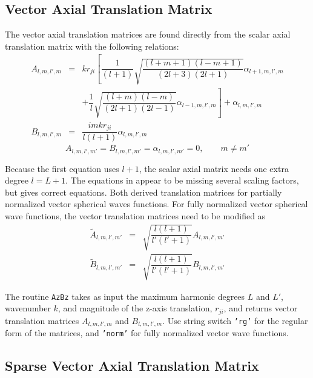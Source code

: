 \subsection{Vector Axial Translation Matrix}

The vector axial translation matrices are found directly from the scalar axial translation matrix with the following relations:
\begin{eqnarray}
A_{l,m,l',m} &=& k r_{ji}\left[\dfrac{1}{(l+1)}\sqrt{\dfrac{(l+m+1)(l-m+1)}{(2l+3)(2l+1)}} \alpha_{l+1,m,l',m} \right. \nonumber \\
\ & \ & + \left. \dfrac{1}{l}\sqrt{\dfrac{(l+m)(l-m)}{(2l+1)(2l-1)}}\alpha_{l-1,m,l',m} \right] + \alpha_{l,m,l',m} \\
B_{l,m,l',m} &=& \dfrac{imkr_{ji}}{l(l+1)}\alpha_{l,m,l',m} 
\end{eqnarray}
\begin{equation}
A_{l,m,l',m'} = B_{l,m,l',m'} = \alpha_{l,m,l',m'} = 0, \quad \quad m \ne m'
\end{equation}

Because the first equation uses $l+1$, the scalar axial matrix needs one extra degree $l = L+1$.  The equations in \cite{mackowski1991analysis} appear to be missing several scaling factors, but \cite{chew1993efficient} gives correct equations.  Both \cite{mackowski1991analysis, chew1993efficient} derived translation matrices for partially normalized vector spherical waves functions.  For fully normalized vector spherical wave functions, the vector translation matrices need to be modified as 
\begin{eqnarray}
\widetilde{A}_{l,m,l',m'} &=& \sqrt{\dfrac{l(l+1)}{l'(l'+1)}} A_{l,m,l',m'}\\
\widetilde{B}_{l,m,l',m'} &=& \sqrt{\dfrac{l(l+1)}{l'(l'+1)}}B_{l,m,l',m'}
\end{eqnarray}

The routine \texttt{AzBz} takes as input the maximum harmonic degrees $L$ and $L'$, wavenumber $k$, and magnitude of the z-axis translation, $r_{ji}$, and returns vector translation matrices $A_{l,m,l',m}$ and $B_{l,m,l',m}$. Use string switch \texttt{'rg'} for the regular form of the matrices, and \texttt{'norm'} for fully normalized vector wave functions. 

{\footnotesize
{}
}




\subsection{Sparse Vector Axial Translation Matrix}

